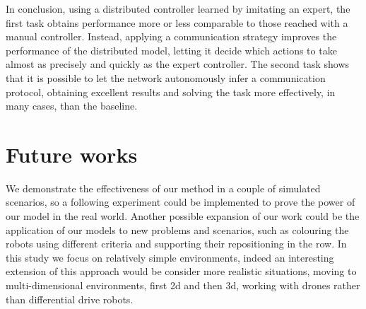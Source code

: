 In conclusion, using a distributed controller learned by imitating an expert, the 
first task obtains performance more or less comparable to those reached with 
a manual controller. Instead, applying a communication strategy improves the 
performance of the distributed model, letting it decide which actions to take 
almost as precisely and quickly as the expert controller.
The second task shows that it is possible to let the network autonomously infer a 
communication protocol, obtaining excellent results and solving the task more 
effectively, in many cases, than the baseline.

\section{Future works}
\label{sec:future}

We demonstrate the effectiveness of our method in a couple of simulated 
scenarios, so a following experiment could be implemented to prove the power of 
our model in the real world.
Another possible expansion of our work could be the application of our models to 
new problems and scenarios, such as colouring the robots using different criteria 
and supporting their repositioning in the row.
In this study we focus on relatively simple environments, indeed an interesting 
extension of this approach would be consider more realistic situations, moving to 
multi-dimensional environments, first \gls{2d} and then \gls{3d}, working with 
drones rather than differential drive robots.

